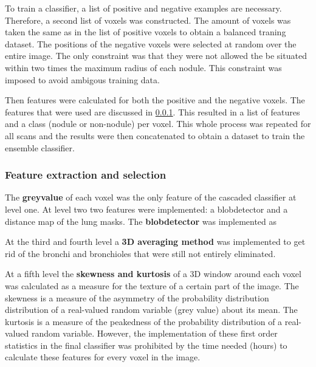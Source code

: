 To train a classifier, a list of positive and negative
examples are necessary. Therefore, a second list of voxels was constructed. The
amount of voxels was taken the same as in the list of positive voxels to obtain
a balanced traning dataset. The positions of the negative voxels were selected
at random over the entire image. The only constraint was that they were not
allowed the be situated within two times the maximum radius of each nodule. This
constraint was imposed to avoid ambigous training data.

Then features were calculated for both the positive and the negative voxels. The
features that were used are discussed in \ref{sec:featureExtraction}. This
resulted in a list of features and a class (nodule or non-nodule) per voxel.
This whole process was repeated for all scans and the results were then
concatenated to obtain a dataset to train the ensemble classifier.

\subsubsection{Feature extraction and selection} \label{sec:featureExtraction}
The \textbf{greyvalue} of each voxel was the only feature of the
cascaded classifier at level one. 
At level two two features were implemented: a blobdetector and a distance map
of the lung masks. The \textbf{blobdetector} was implemented as 



At the third and fourth level a \textbf{3D averaging method} \cite{keshani} was
implemented to get rid of the bronchi and bronchioles that were still not entirely eliminated. 

At a fifth level the \textbf{skewness and kurtosis} of a 3D window around each
voxel was calculated as a measure for the texture of a certain part of the image. The
skewness is a measure of the asymmetry of the probability distribution
distribution of a real-valued random variable (grey value) about its mean. The
kurtosis is a measure of the peakedness of the probability distribution of a
real-valued random variable. However, the implementation of these first order
statistics in the final classifier was prohibited by the time needed (hours) to
calculate these features for every voxel in the image.

